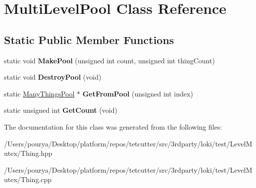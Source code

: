 \hypertarget{classMultiLevelPool}{}\section{Multi\+Level\+Pool Class Reference}
\label{classMultiLevelPool}
\subsection*{Static Public Member Functions}
\begin{DoxyCompactItemize}
\item 
\hypertarget{classMultiLevelPool_af3ceececc86f092e4167b3e5c6427bd7}{}static void {\bfseries Make\+Pool} (unsigned int count, unsigned int thing\+Count)\label{classMultiLevelPool_af3ceececc86f092e4167b3e5c6427bd7}

\item 
\hypertarget{classMultiLevelPool_ac7b5319f63e41497021480c834c2918f}{}static void {\bfseries Destroy\+Pool} (void)\label{classMultiLevelPool_ac7b5319f63e41497021480c834c2918f}

\item 
\hypertarget{classMultiLevelPool_a0032382dd58cbaea57aefa9ac59abb7b}{}static \hyperlink{classManyThingsPool}{Many\+Things\+Pool} $\ast$ {\bfseries Get\+From\+Pool} (unsigned int index)\label{classMultiLevelPool_a0032382dd58cbaea57aefa9ac59abb7b}

\item 
\hypertarget{classMultiLevelPool_a4da8bfe72914ecebe91121baf43c5b23}{}static unsigned int {\bfseries Get\+Count} (void)\label{classMultiLevelPool_a4da8bfe72914ecebe91121baf43c5b23}

\end{DoxyCompactItemize}


The documentation for this class was generated from the following files\+:\begin{DoxyCompactItemize}
\item 
/\+Users/pourya/\+Desktop/platform/repos/tetcutter/src/3rdparty/loki/test/\+Level\+Mutex/Thing.\+hpp\item 
/\+Users/pourya/\+Desktop/platform/repos/tetcutter/src/3rdparty/loki/test/\+Level\+Mutex/Thing.\+cpp\end{DoxyCompactItemize}
